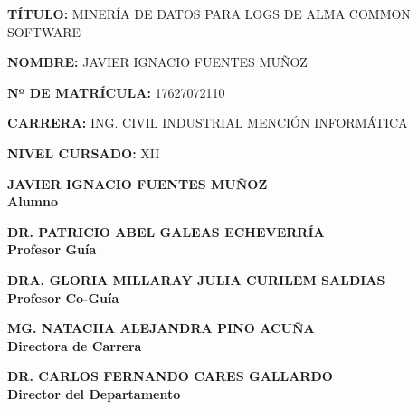 \documentclass[12pt]{article}
\begin{document}
\vspace{1cm}

\begin{flushleft}
\textbf{TÍTULO:} MINERÍA DE DATOS PARA LOGS DE ALMA COMMON SOFTWARE\\

\vspace{1cm}

\textbf{NOMBRE:} JAVIER IGNACIO FUENTES MUÑOZ\\

\vspace{1cm}

\textbf{Nº DE MATRÍCULA:} 17627072110\\

\vspace{1cm}

\textbf{CARRERA:} ING. CIVIL INDUSTRIAL MENCIÓN INFORMÁTICA\\

\vspace{1cm}

\textbf{NIVEL CURSADO:} XII

\end{flushleft}

\vfill


\begin{center}
\textbf{JAVIER IGNACIO FUENTES MUÑOZ\\Alumno}
\vspace{1cm}

\textbf{DR. PATRICIO ABEL GALEAS ECHEVERRÍA\\Profesor Guía}
\vspace{1cm}

\textbf{DRA. GLORIA MILLARAY JULIA CURILEM SALDIAS\\Profesor Co-Guía}
\vspace{1cm}

\textbf{MG. NATACHA ALEJANDRA PINO ACUÑA\\Directora de Carrera}

\vspace{1cm}

\textbf{DR. CARLOS FERNANDO CARES GALLARDO\\Director del Departamento}

\end{center}
\vspace{2cm}
\setcounter{page}{0}
\thispagestyle{empty}
\newpage

\tableofcontents

\listoffigures

\lstlistoflistings

\setcounter{page}{0}
\thispagestyle{empty}
\newpage







\end{document}
